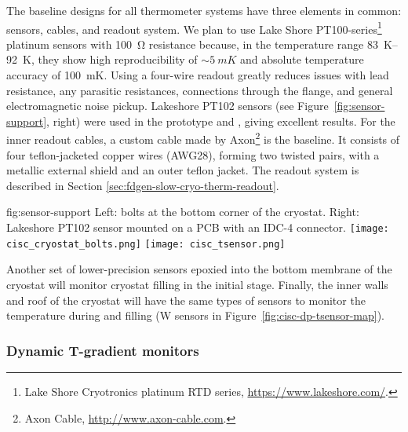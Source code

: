 The baseline designs for all thermometer systems have three elements in
common: sensors, cables, and readout system. We plan to use Lake Shore
PT100-series\footnote{Lake Shore Cryotronics\texttrademark{} platinum RTD series,
  \url{https://www.lakeshore.com/}.} %
platinum sensors with \SI{100}{\ohm} resistance %
because, in
the temperature range \SIrange{83}{92}{K}, %
they 
show high reproducibility of $\sim\SI{5}{mK}$ and absolute temperature
accuracy of \SI{100}{mK}.  Using a four-wire readout greatly reduces
issues with lead resistance, any parasitic resistances,
connections through the flange, and general electromagnetic noise
pickup. Lakeshore PT102 sensors (see
Figure~\ref{fig:sensor-support}, right) were used in the  prototype
and , %
giving excellent results. For the inner
readout cables, a custom cable made by Axon\footnote{Axon\texttrademark{} Cable, \url{http://www.axon-cable.com}.}
is the baseline. It
consists of four teflon-jacketed copper wires (AWG28), forming two
twisted pairs, with a metallic external shield and an outer teflon
jacket.
The readout system is described in Section \ref{sec:fdgen-slow-cryo-therm-readout}.

\begin{dunefigure}{fig:sensor-support}
  {Left: bolts at the bottom corner of the cryostat. Right: Lakeshore PT102 sensor mounted on a PCB with an IDC-4 connector.}
  \texttt{[image: cisc\_cryostat\_bolts.png]}%
    \hspace{1cm}%
  \texttt{[image: cisc\_tsensor.png]}%
\end{dunefigure}


Another set of lower-precision sensors epoxied into the bottom membrane of the cryostat will monitor  cryostat filling in the initial stage.   
Finally, the inner walls and roof of the cryostat will have the same types of sensors to monitor the temperature during \cooldown and filling (W sensors in Figure~\ref{fig:cisc-dp-tsensor-map}).
 

\subsubsection{Dynamic T-gradient monitors}
\label{sec:fdgen-slow-cryo-dynamic-therm}

